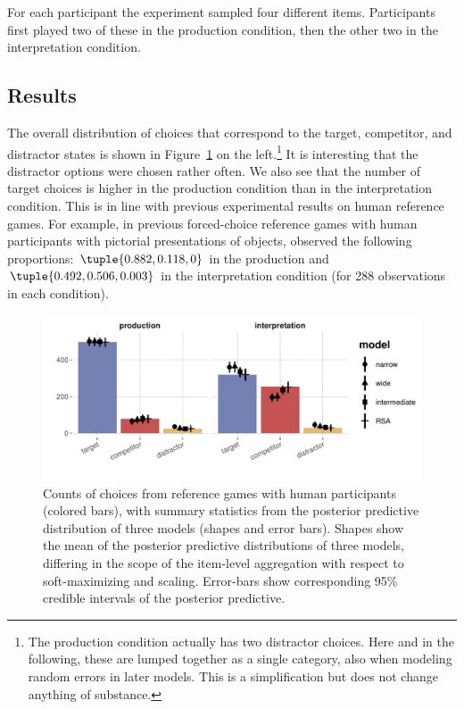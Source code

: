 \documentclass[fleqn]{article}
\begin{document}
For each participant the experiment sampled four different items.
Participants first played two of these in the production condition, then the other two in the interpretation condition.


\subsection{Results}\label{results}

The overall distribution of choices that correspond to the target, competitor, and distractor states is shown in Figure~\ref{fig:refgame-counts} on the left.\footnote{
  The production condition actually has two distractor choices.
  Here and in the following, these are lumped together as a single category, also when modeling random errors in later models.
  This is a simplification but does not change anything of substance.}
It is interesting that the distractor options were chosen rather often.
We also see that the number of target choices is higher in the production condition than in the interpretation condition.
This is in line with previous experimental results on human reference games.
For example, in previous forced-choice reference games with human participants with pictorial presentations of objects, \citet{QingFranke2013:Variations-on-a} observed the following proportions: $\tuple{0.882, 0.118, 0}$ in the production and $\tuple{0.492, 0.506, 0.003}$ in the interpretation condition (for 288 observations in each condition).

\begin{figure}
  \centering

    \includegraphics[width=0.9\linewidth]{00-pics/PPC-alpha-eps-model.pdf}

    \caption{Counts of choices from reference games with human participants (colored bars), with summary statistics from the posterior predictive distribution of three models (shapes and error bars).
      Shapes show the mean of the posterior predictive distributions of three models, differing in the scope of the item-level aggregation with respect to soft-maximizing and scaling.
      Error-bars show corresponding 95\% credible intervals of the posterior predictive.
    }
  \label{fig:refgame-counts}
\end{figure}
\end{document}
